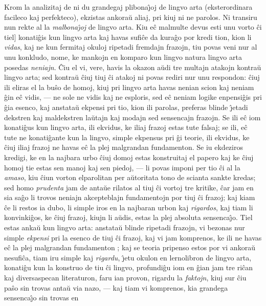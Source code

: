    Krom la analizitaj de ni du grandegaj plibona\^{\j}oj de lingvo arta
(eksterordinara facileco kaj perfekteco), ekzistas ankora\u u aliaj,
pri kiuj ni ne parolos. Ni transiru nun rekte al la {\sl
malbona\^{\j}oj} de lingvo arta. Kiu e\^c malmulte devus esti unu
vorto \^ci tiel] konati\^gis kun lingvo arta kaj havas sufi\^ce da
kura\^go por kredi tion, kion li {\sl vidas}, kaj ne kun fermitaj
okuloj ripetadi fremdajn frazojn, tiu povas veni nur al unu
konkludo, nome, ke mankojn en komparo kun lingvo natura lingvo arta
posedas {\sl neniajn}. \^Ciu el vi, vere, havis la okazon a\u udi
tre multajn atakojn kontra\u u lingvo arta; sed kontra\u u \^ciuj
tiuj \^ci atakoj ni povas rediri nur unu respondon: \^ciuj ili
eliras el la bu\^so de homoj, kiuj pri lingvo arta havas nenian
scion kaj neniam \^gin e\^c vidis, --- ne sole ne vidis kaj ne
esploris, sed e\^c neniam logike enpensi\^gis pri \^gia esenco, kaj
anstata\u u ekpensi pri tio, kion ili parolas, preferas blinde
\^{\j}etadi dekstren kaj maldekstren la\u utajn kaj modajn sed
sensencajn frazojn. Se ili e\^c iom konati\^gus kun lingvo arta, ili
ekvidus, ke iliaj frazoj estas tute falsaj; se ili, e\^c tute ne
konati\^gante kun la lingvo, simple ekpensus pri \^gi teorie, ili
ekvidus, ke \^ciuj iliaj frazoj ne havas e\^c la plej malgrandan
fundamenton. Se iu ekdeziros kredigi, ke en la najbara urbo \^ciuj
domoj estas konstruitaj el papero kaj ke \^ciuj homoj tie estas sen
manoj kaj sen piedoj, --- li povas imponi per tio \^ci al la {\sl
amaso}, kiu \^ciun vorton elparolitan per a\u utoritata tono de
scianta sankte kredas; sed homo {\sl prudenta} jam de anta\u ue
rilatos al tiuj \^ci vortoj tre kritike, \^car jam en sia sa\^go li
trovos neniajn akcepteblajn fundamentojn por tiuj \^ci frazoj; kaj
kiam \^ce li restos ia dubo, li simple iros en la najbaran urbon kaj
{\sl rigardos}, kaj tiam li konvinki\^gos, ke \^ciuj frazoj, kiujn
li a\u udis, estas la plej absoluta sensenca\^{\j}o. Tiel estas
anka\u u kun lingvo arta: anstata\u u blinde ripetadi frazojn, vi
bezonas nur simple {\sl ekpensi} pri la esenco de tiuj \^ci frazoj,
kaj vi jam komprenos, ke ili ne havas e\^c la plej malgrandan
fundamenton ; kaj se teoria pripenso estos por vi ankora\u u
nesufi\^ca, tiam iru simple kaj {\sl rigardu}, \^{\j}etu okulon en
lernolibron de lingvo arta, konati\^gu kun la konstruo de tiu \^ci
lingvo, profundi\^gu iom en \^gian jam tre ri\^can kaj diversaspecan
literaturon, faru ian provon, rigardu la {\sl faktojn}, kiuj sur
\^ciu pa\^so sin trovas anta\u u via nazo,
--- kaj tiam vi komprenos, kia grandega sensenca\^{\j}o sin trovas en

